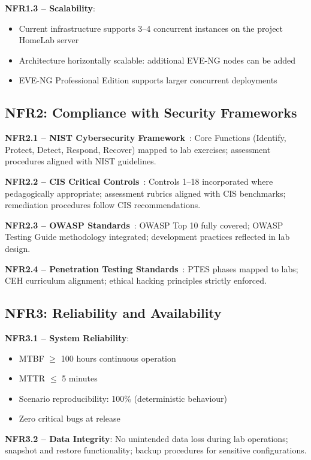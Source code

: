 \textbf{NFR1.3 -- Scalability}:
\begin{itemize}
\item Current infrastructure supports 3--4 concurrent instances on the project HomeLab server
\item Architecture horizontally scalable: additional EVE-NG nodes can be added
\item EVE-NG Professional Edition supports larger concurrent deployments
\end{itemize}

\subsection{NFR2: Compliance with Security Frameworks}

\textbf{NFR2.1 -- NIST Cybersecurity Framework}~\cite{nist_framework}:
Core Functions (Identify, Protect, Detect, Respond, Recover) mapped to lab exercises;
assessment procedures aligned with NIST guidelines.

\textbf{NFR2.2 -- CIS Critical Controls}~\cite{cis_controls}:
Controls 1--18 incorporated where pedagogically appropriate; assessment rubrics aligned
with CIS benchmarks; remediation procedures follow CIS recommendations.

\textbf{NFR2.3 -- OWASP Standards}~\cite{owasp2021,owasp_testing_guide}:
OWASP Top 10 fully covered; OWASP Testing Guide methodology integrated;
development practices reflected in lab design.

\textbf{NFR2.4 -- Penetration Testing Standards}~\cite{ptes,ceh_framework}:
PTES phases mapped to labs; CEH curriculum alignment; ethical hacking principles strictly
enforced.

\subsection{NFR3: Reliability and Availability}

\textbf{NFR3.1 -- System Reliability}:
\begin{itemize}
\item MTBF $\geq$ 100 hours continuous operation
\item MTTR $\leq$ 5 minutes
\item Scenario reproducibility: 100\% (deterministic behaviour)
\item Zero critical bugs at release
\end{itemize}

\textbf{NFR3.2 -- Data Integrity}:
No unintended data loss during lab operations; snapshot and restore functionality;
backup procedures for sensitive configurations.

